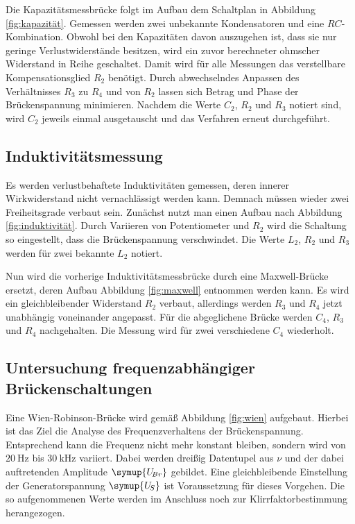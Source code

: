 Die Kapazitätsmessbrücke folgt im Aufbau dem Schaltplan in Abbildung \ref{fig:kapazität}. Gemessen
werden zwei unbekannte Kondensatoren und eine $RC$-Kombination. Obwohl bei den Kapazitäten davon auszugehen
ist, dass sie nur geringe Verlustwiderstände besitzen, wird ein zuvor berechneter ohmscher Widerstand in Reihe
geschaltet. Damit wird für alle Messungen das verstellbare Kompensationsglied $R_2$ benötigt. Durch abwechselndes
Anpassen des Verhältnisses $R_3$ zu $R_4$ und von $R_2$ lassen sich Betrag und Phase der Brückenspannung
minimieren. Nachdem die Werte $C_2$, $R_2$ und $R_3$ notiert sind, wird $C_2$ jeweils einmal ausgetauscht
und das Verfahren erneut durchgeführt.

\subsection{Induktivitätsmessung}

Es werden verlustbehaftete Induktivitäten gemessen, deren innerer Wirkwiderstand nicht vernachlässigt werden
kann. Demnach müssen wieder zwei Freiheitsgrade verbaut sein. Zunächst nutzt man einen Aufbau nach Abbildung
\ref{fig:induktivität}. Durch Variieren von Potentiometer und $R_2$ wird die Schaltung so eingestellt, dass
die Brückenspannung verschwindet. Die Werte $L_2$, $R_2$ und $R_3$ werden für zwei bekannte $L_2$ notiert.

Nun wird die vorherige Induktivitätsmessbrücke durch eine Maxwell-Brücke ersetzt, deren Aufbau Abbildung
\ref{fig:maxwell} entnommen werden kann. Es wird ein gleichbleibender Widerstand $R_2$ verbaut, allerdings
werden $R_3$ und $R_4$ jetzt unabhängig voneinander angepasst. Für die abgeglichene Brücke werden $C_4$,
$R_3$ und $R_4$ nachgehalten. Die Messung wird für zwei verschiedene $C_4$ wiederholt.

\subsection{Untersuchung frequenzabhängiger Brückenschaltungen}

Eine Wien-Robinson-Brücke wird gemäß Abbildung \ref{fig:wien} aufgebaut. Hierbei ist das Ziel die Analyse des
Frequenzverhaltens der Brückenspannung. Entsprechend kann die Frequenz nicht mehr konstant bleiben, sondern
wird von $\qty{20}{\hertz}$ bis $\qty{30}{\kilo\hertz}$ variiert. Dabei werden dreißig Datentupel aus $\nu$ und
der dabei auftretenden Amplitude $\symup{U_{\! Br}}$ gebildet. Eine gleichbleibende Einstellung der
Generatorspannung $\symup{U_{\! S}}$ ist Voraussetzung für dieses Vorgehen. Die so aufgenommenen Werte werden
im Anschluss noch zur Klirrfaktorbestimmung herangezogen.
